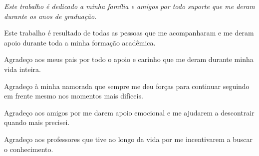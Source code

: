\documentclass[
	12pt,				%
	openright,			%
	twoside,			%
	a4paper,			%
	english,			%
	french,				%
	spanish,			%
	brazil				%
	]{abntex2}
\begin{document}

%      
  

\begin{dedicatoria}
   \vspace*{\fill}
   \centering
   \noindent
   \textit{ Este trabalho é dedicado a minha família e amigos por todo suporte que me deram durante os anos de graduação.} \vspace*{\fill}
\end{dedicatoria}

\begin{agradecimentos}

Este trabalho é resultado de todas as pessoas que me acompanharam e me deram apoio durante toda a minha formação acadêmica.

Agradeço aos meus pais por todo o apoio e carinho que me deram durante minha vida inteira.

Agradeço à minha namorada que sempre me deu forças para continuar seguindo em frente mesmo nos momentos mais difíceis.

Agradeço aos amigos por me darem apoio emocional e me ajudarem a descontrair quando mais precisei.

Agradeço aos professores que tive ao longo da vida por me incentivarem a buscar o conhecimento.

\end{agradecimentos}

\end{document}
